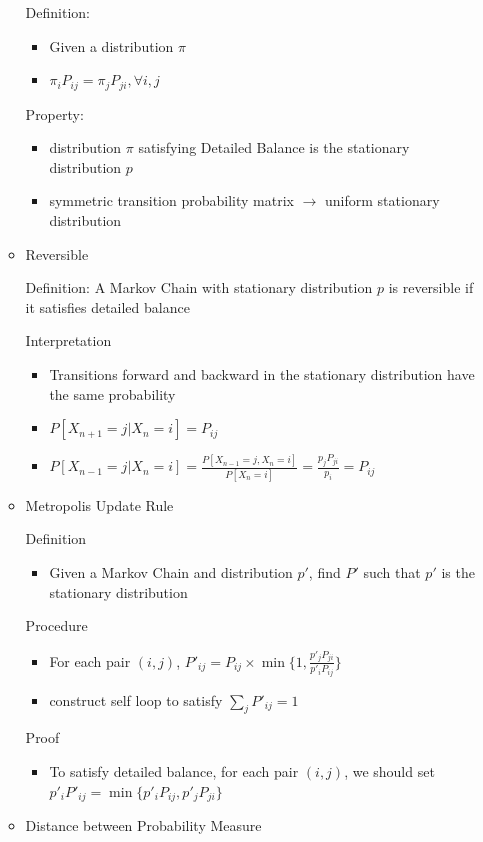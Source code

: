\documentclass[a4paper]{article}
\begin{document}
\begin{itemize}
\begin{itemize}
                Definition:
                \begin{itemize}
                    \item Given a distribution $\pi$
                    \item $\pi_i P_{ij} = \pi_j P_{ji}, \forall i, j$
                \end{itemize}
                Property: 
                \begin{itemize}
                    \item distribution $\pi$ satisfying Detailed Balance is the stationary distribution $p$
                    \item symmetric transition probability matrix $\rightarrow$ uniform stationary distribution
                \end{itemize}
            \item Reversible

                Definition: A Markov Chain with stationary distribution $p$ is reversible if it satisfies detailed balance

                Interpretation
                \begin{itemize}
                    \item Transitions forward and backward in the stationary distribution have the same probability
                    \item $P[X_{n+1} = j| X_n = i] = P_{ij}$
                    \item $P[X_{n-1} = j| X_n = i] = \frac{P[X_{n-1} = j, X_n = i]}{P[X_n = i]} = \frac{p_j P_{ji}}{p_i} = P_{ij}$
                \end{itemize}
            \item Metropolis Update Rule

                Definition
                \begin{itemize}
                    \item Given a Markov Chain and distribution $p'$, find $P'$ such that $p'$ is the stationary distribution
                \end{itemize}
                Procedure
                \begin{itemize}
                    \item For each pair $(i,j)$, $P'_{ij} = P_{ij} \times \min\{1, \frac{p'_j P_{ji}}{p'_i P_{ij}} \}$
                    \item construct self loop to satisfy $\sum_j P'_{ij} = 1$
                \end{itemize}
                Proof
                \begin{itemize}
                    \item To satisfy detailed balance, for each pair $(i, j)$, we should set $p'_i P'_{ij} = \min\{p'_i P_{ij}, p'_j P_{ji}\}$ 
                \end{itemize}
            \item Distance between Probability Measure
                

\end{itemize}
\end{itemize}
\end{document}
